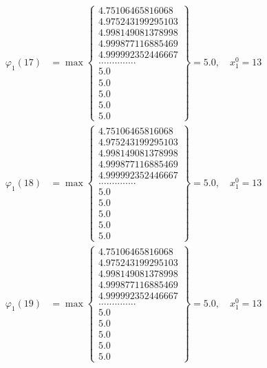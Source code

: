 \documentclass{article}
\begin{document}
\begin{align*}
  
  
  
\varphi_{1}(17) &= \max \left\{ \begin{array}{c}
4.75106465816068 \\
 4.975243199295103 \\
 4.998149081378998 \\
 4.999877116885469 \\
 4.999992352446667 \\
 .............. \\
 5.0 \\
 5.0 \\
 5.0 \\
 5.0 \\
 5.0
\end{array} \right\} = 5.0, \quad x_{1}^0 = 13\\
  
  
  
  
\varphi_{1}(18) &= \max \left\{ \begin{array}{c}
4.75106465816068 \\
 4.975243199295103 \\
 4.998149081378998 \\
 4.999877116885469 \\
 4.999992352446667 \\
 .............. \\
 5.0 \\
 5.0 \\
 5.0 \\
 5.0 \\
 5.0
\end{array} \right\} = 5.0, \quad x_{1}^0 = 13\\
  
  
  
  
\varphi_{1}(19) &= \max \left\{ \begin{array}{c}
4.75106465816068 \\
 4.975243199295103 \\
 4.998149081378998 \\
 4.999877116885469 \\
 4.999992352446667 \\
 .............. \\
 5.0 \\
 5.0 \\
 5.0 \\
 5.0 \\
 5.0
\end{array} \right\} = 5.0, \quad x_{1}^0 = 13\\
  

\end{align*}
\end{document}
